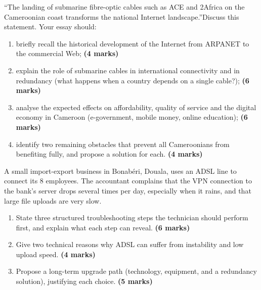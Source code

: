 \documentclass[11pt]{article}
\begin{document}
\begin{exercice}
``The landing of submarine fibre-optic cables such as ACE and 2Africa on the Cameroonian coast transforms the national Internet landscape.''Discuss this statement. Your essay should:
\begin{enumerate}
\item briefly recall the historical development of the Internet from ARPANET to the commercial Web; \textbf{(4 marks)}
\item explain the role of submarine cables in international connectivity and in redundancy (what happens when a country depends on a single cable?); \textbf{(6 marks)}
\item analyse the expected effects on affordability, quality of service and the digital economy in Cameroon (e-government, mobile money, online education); \textbf{(6 marks)}
\item identify two remaining obstacles that prevent all Cameroonians from benefiting fully, and propose a solution for each. \textbf{(4 marks)}
\end{enumerate}
\end{exercice}

\begin{exercice}
A small import-export business in Bonab\'eri, Douala, uses an ADSL line to connect its 8 employees. The accountant complains that the VPN connection to the bank's server drops several times per day, especially when it rains, and that large file uploads are very slow.
\begin{enumerate}
\item State three structured troubleshooting steps the technician should perform first, and explain what each step can reveal. \textbf{(6 marks)}
\item Give two technical reasons why ADSL can suffer from instability and low upload speed. \textbf{(4 marks)}
\item Propose a long-term upgrade path (technology, equipment, and a redundancy solution), justifying each choice. \textbf{(5 marks)}
\end{enumerate}
\end{exercice}
\end{document}
